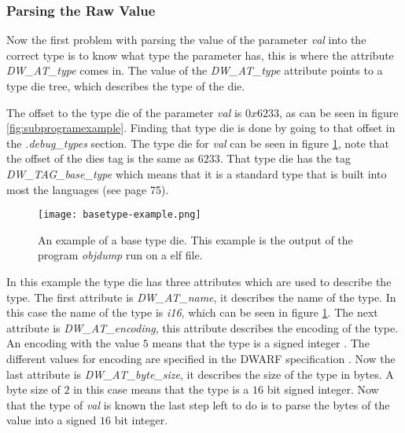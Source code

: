 \subsubsection{Parsing the Raw Value} \label{sec:parsingvalue}
Now the first problem with parsing the value of the parameter \emph{val} into the correct type is to know what type the parameter has, this is where the attribute \emph{DW\_AT\_type} comes in.
The value of the \emph{DW\_AT\_type} attribute points to a type \gls{die} tree, which describes the type of the \gls{die}.


The offset to the type \gls{die} of the parameter \emph{val} is $0x6233$, as can be seen in figure \ref{fig:subprogramexample}.
Finding that type \gls{die} is done by going to that offset in the \emph{.debug\_types} section.
The type \gls{die} for \emph{val} can be seen in figure \ref{fig:basetypeexample}, note that the offset of the \glspl{die} tag is the same as $6233$.
That type \gls{die} has the tag \emph{DW\_TAG\_base\_type} which means that it is a standard type that is built into most the languages (see \cite{dwarf} page 75).


\begin{figure}[h]
	\centering
	\texttt{[image: basetype-example.png]}
	\caption{An example of a base type \gls{die}. This example is the output of the program \emph{objdump} run on a \gls{elf} file.}
	\label{fig:basetypeexample}
\end{figure}


In this example the type \gls{die} has three attributes which are used to describe the type.
The first attribute is \emph{DW\_AT\_name}, it describes the name of the type.
In this case the name of the type is \emph{i16}, which can be seen in figure \ref{fig:basetypeexample}.
The next attribute is \emph{DW\_AT\_encoding}, this attribute describes the encoding of the type.
An encoding with the value $5$ means that the type is a signed integer \cite{dwarf}.
The different values for encoding are specified in the \gls{DWARF} specification \cite{dwarf}.
Now the last attribute is \emph{DW\_AT\_byte\_size}, it describes the size of the type in bytes.
A byte size of $2$ in this case means that the type is a $16$ bit signed integer.
Now that the type of \emph{val} is known the last step left to do is to parse the bytes of the value into a signed $16$ bit integer.



